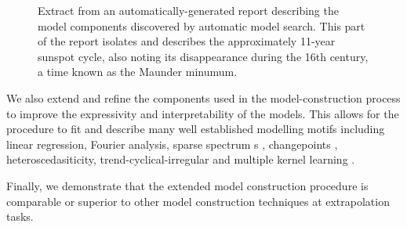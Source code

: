 \documentclass[letterpaper]{article}
\begin{document}
\begin{figure}[t]
\centering
{}
\caption{Extract from an automatically-generated report describing the model components discovered by automatic model search.  This part of the report isolates and describes the approximately 11-year sunspot cycle, also noting its disappearance during the 16th century, a time known as the Maunder minumum.}
\label{fig:periodic}
\end{figure}

We also extend and refine the components used in the model-construction process to improve the expressivity and interpretability of the models.
This allows for the procedure to fit and describe many well established modelling motifs including linear regression, Fourier analysis, sparse spectrum \gp{}s \citep{lazaro2010sparse}, changepoints \citep[e.g.][]{garnett2010sequential, FoxDunson:NIPS2012}, heteroscedasiticity, trend-cyclical-irregular \citep[e.g.][]{lind2006basic} and multiple kernel learning \citep[e.g.][]{bach2004multiple}.

Finally, we demonstrate that the extended model construction procedure is comparable or superior to other model construction techniques at extrapolation tasks.
\end{document}
